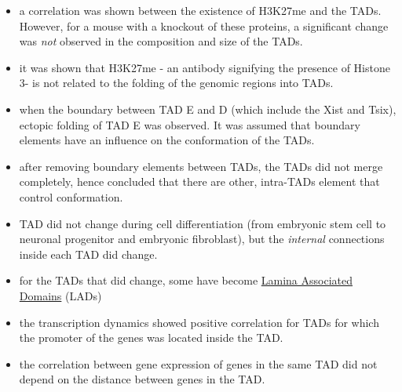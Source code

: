 \documentclass[12pt]{paper}
\begin{document}
\begin{itemize}
\item a correlation was shown between the existence of H3K27me and the TADs. However, for a mouse with a knockout of these proteins, a significant change was \textit{not} observed in the composition and size of the TADs.
\item it was shown that H3K27me - an antibody signifying the presence of Histone 3- is not related to the folding of the genomic regions into TADs. 
\item when the boundary between TAD E and D (which include the Xist and Tsix), ectopic folding of TAD E was observed. It was assumed that boundary elements have an influence on the conformation of the TADs. 
\item after removing boundary elements between TADs, the TADs did not merge completely, hence concluded that there are other, intra-TADs element that control conformation.
\item TAD did not change during cell differentiation (from embryonic stem cell to neuronal progenitor and embryonic fibroblast), but the \textit{internal} connections inside each TAD did change.
\item for the TADs that did change, some have become \href{http://www.nature.com/nature/journal/v453/n7197/full/nature06947.html}{Lamina Associated Domains} (LADs) 
\item the transcription dynamics showed positive correlation for TADs for which the promoter of the genes was located inside the TAD. 
\item the correlation between gene expression of genes in the same TAD did not depend on the distance between genes in the TAD. 
\end{itemize}
\end{document}
